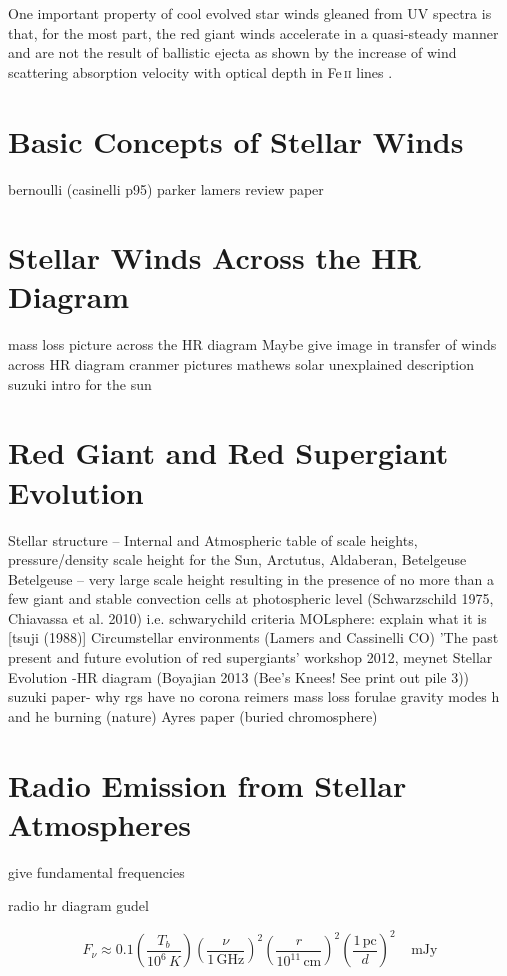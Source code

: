 One important property of cool evolved star winds gleaned from UV spectra is that, for the most part, the red giant winds accelerate in a quasi-steady manner and are not the result of ballistic ejecta as shown by the increase of wind scattering absorption velocity with optical depth in Fe\,\textsc{ii} lines \citep{carpenter_1999}.
\section{Basic Concepts of Stellar Winds}\label{sec:2}
bernoulli (casinelli p95) parker
lamers review paper

\section{Stellar Winds Across the HR Diagram}
mass loss picture across the HR diagram
Maybe give image in transfer of winds across HR diagram
cranmer pictures
mathews solar unexplained description
suzuki intro for the sun

\section{Red Giant and Red Supergiant Evolution}\label{sec:3}
Stellar structure – Internal and Atmospheric
table of scale heights, pressure/density scale height for the Sun, Arctutus, Aldaberan, Betelgeuse
Betelgeuse – very large scale height  resulting in the
presence of no more than a few giant and stable convection cells at photospheric
level (Schwarzschild 1975, Chiavassa et al. 2010) i.e. schwarychild criteria
MOLsphere: explain what it is [tsuji (1988)]
Circumstellar environments (Lamers and Cassinelli CO)
'The past present and future evolution of red supergiants' workshop 2012, meynet
Stellar Evolution -HR diagram (Boyajian 2013 (Bee's Knees! See print out pile 3))
suzuki paper- why rgs have no corona
reimers mass loss forulae
gravity modes h and he burning (nature)
Ayres paper (buried chromosphere)

\section{Radio Emission from Stellar Atmospheres} 
give fundamental frequencies

radio hr diagram gudel


\begin{equation}
F_{\nu}\approx 0.1\left(\frac{T_{b}}{10^6\,K}\right)\left(\frac{\nu}{1\,\mathrm{GHz}}\right)^2\left(\frac{r}{10^{11}\,\mathrm{cm}}\right)^2\left(\frac{1\,\mathrm{pc}}{d}\right)^2\ \ \ \ \ \mathrm{mJy}
\end{equation}
\citep{gudel_2002}

